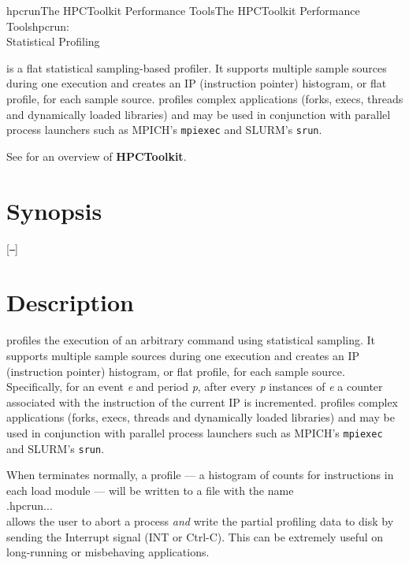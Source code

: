 \documentclass[english]{article}
\begin{document}
\begin{Name}{1}{hpcrun}{The HPCToolkit Performance Tools}{The HPCToolkit Performance Tools}{hpcrun:\\ Statistical Profiling}

 is a flat statistical sampling-based profiler.
It supports multiple sample sources during one execution and creates an IP (instruction pointer) histogram, or flat profile, for each sample source.
 profiles complex applications (forks, execs, threads and dynamically loaded libraries) and may be used in conjunction with parallel process launchers such as MPICH's \texttt{mpiexec} and SLURM's \texttt{srun}.

See  for an overview of \textbf{HPCToolkit}.


\end{Name}

\section{Synopsis}

  [\texttt{--}]  

 

\section{Description}

 profiles the execution of an arbitrary command  using statistical sampling.
It supports multiple sample sources during one execution and creates an IP (instruction pointer) histogram, or flat profile, for each sample source.
Specifically, for an event \emph{e} and period \emph{p}, after every \emph{p} instances of \emph{e} a counter associated with the instruction of the current IP is incremented.
 profiles complex applications (forks, execs, threads and dynamically loaded libraries) and may be used in conjunction with parallel process launchers such as MPICH's \texttt{mpiexec} and SLURM's \texttt{srun}.

When  terminates normally, a profile --- a histogram of counts for instructions in each load module --- will be written to a file with the name\\
\SP\SP\SP {}.hpcrun...\\
 allows the user to abort a process \emph{and} write the partial profiling data to disk by sending the Interrupt signal (INT or Ctrl-C).  This can be extremely useful on long-running or misbehaving applications.
\end{document}
